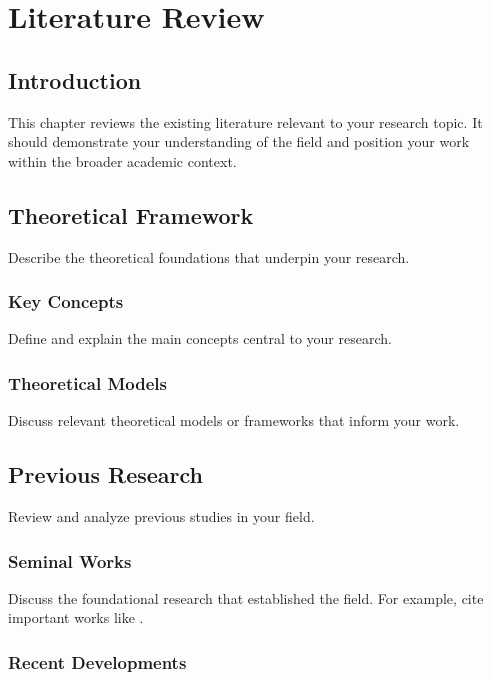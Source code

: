 \chapter{Literature Review}

\section{Introduction}

This chapter reviews the existing literature relevant to your research topic. It should demonstrate your understanding of the field and position your work within the broader academic context.

\section{Theoretical Framework}

Describe the theoretical foundations that underpin your research.

\subsection{Key Concepts}

Define and explain the main concepts central to your research.

\subsection{Theoretical Models}

Discuss relevant theoretical models or frameworks that inform your work.

\section{Previous Research}

Review and analyze previous studies in your field.

\subsection{Seminal Works}

Discuss the foundational research that established the field. For example, cite important works like \cite{example2023}.

\subsection{Recent Developments}

